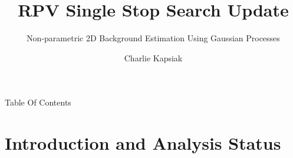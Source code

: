 \documentclass[10pt]{beamer}
\author{Charlie Kapsiak}
\title[Single Stop Update]{RPV Single Stop Search Update}
\subtitle{Non-parametric 2D Background Estimation Using Gaussian Processes}
\begin{document}
\begin{frame}
  \maketitle
\end{frame}

\begin{frame}{Table Of Contents}
  \tableofcontents
\end{frame}

%   
%     
%   
%   
%   
%   

\section[Intro]{Introduction and Analysis Status}
\end{document}
